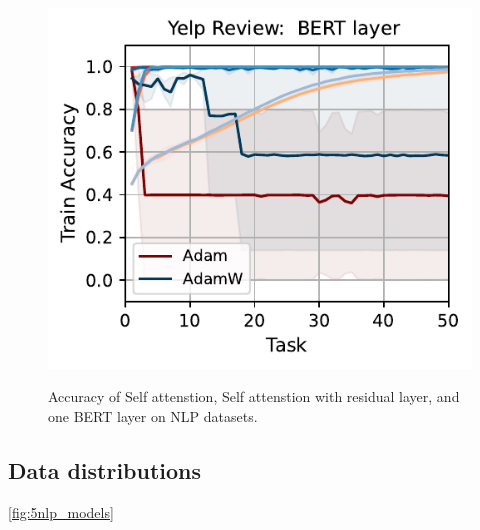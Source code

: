 \begin{figure}[t]
{        \includegraphics[width=\textwidth]{figs/Accuracy/nlp/bert_layer/yelp_review_full_40.pdf}
    }

    \caption{Accuracy of Self attenstion, Self attenstion with residual layer, and one BERT layer on NLP datasets.}
    \label{fig:nlp_self_res}
\end{figure}


\subsection{Data distributions}
\autoref{fig:5nlp_models}

